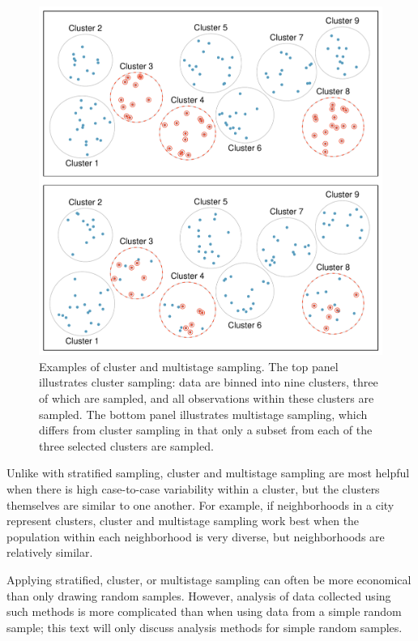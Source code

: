 \begin{figure}
	\centering
	\includegraphics[width=\textwidth]{ch_01a_intro_to_data_oi_biostat/figures/samplingMethodsFigure/cluster_multistage}
	\caption{Examples of cluster and multistage sampling. The top panel illustrates cluster sampling: data are binned into nine clusters, three of which are sampled, and all observations within these clusters are sampled. The bottom panel illustrates multistage sampling, which differs from cluster sampling in that only a subset from each of the three selected clusters are sampled.}
	\label{cluster_multistage}
\end{figure}

Unlike with stratified sampling, cluster and multistage sampling are most helpful when there is high case-to-case variability within a cluster, but the clusters themselves are similar to one another. For example, if neighborhoods in a city represent clusters, cluster and multistage sampling work best when the population within each neighborhood is very diverse, but neighborhoods are relatively similar.

Applying stratified, cluster, or multistage sampling can often be more economical than only drawing random samples. However, analysis of data collected using such methods is more complicated than when using data from a simple random sample; this text will only discuss analysis methods for simple random samples. 

